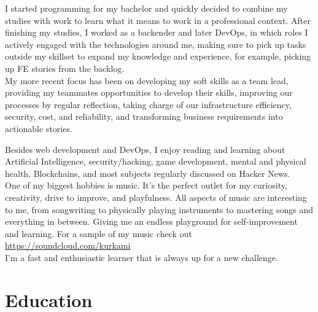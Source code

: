 \documentclass[10pt]{article} %
\begin{document}
I started programming for my bachelor and quickly decided to combine my studies with work to learn what it means to work in a professional context. After finishing my studies, I worked as a backender and later DevOps, in which roles I actively engaged with the technologies around me, making sure to pick up tasks outside my skillset to expand my knowledge and experience, for example, picking up FE stories from the backlog. \\

My more recent focus has been on developing my soft skills as a team lead, providing my teammates opportunities to develop their skills, improving our processes by regular reflection, taking charge of our infrastructure efficiency, security, cost, and reliability, and transforming business requirements into actionable stories.

Besides web development and DevOps, I enjoy reading and learning about Artificial Intelligence, security/hacking, game development, mental and physical health, Blockchains, and most subjects regularly discussed on Hacker News. \\

One of my biggest hobbies is music. It's the perfect outlet for my curiosity, creativity, drive to improve, and playfulness. All aspects of music are interesting to me, from songwriting to physically playing instruments to mastering songs and everything in between. Giving me an endless playground for self-improvement and learning. For a sample of my music check out \href{https://soundcloud.com/kurkami}{https://soundcloud.com/kurkami}  \\

I'm a fast and enthusiastic learner that is always up for a new challenge.


\section{Education}

\end{document}
